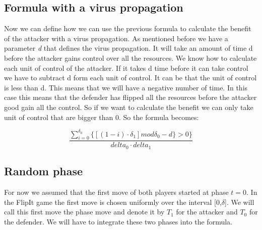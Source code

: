 \subsection{Formula with a virus propagation}
Now we can define how we can use the previous formula to calculate the benefit of the attacker with a virus propagation.
As mentioned before we have a parameter \textit{d} that defines the virus propagation. It will take an amount of time d before the attacker gains control over all the resources. We know how to calculate each unit of control of the attacker. If it takes d time before it can take control we have to subtract d form each unit of control. It can be that the unit of control is less than d. This means that we will have a negative number of time. In this case this means that the defender has flipped all the resources before the attacker good gain all the control. So if we want to calculate the benefit we can only take unit of control that are bigger than 0. So the formula becomes:

\begin{equation}\label{first}
\dfrac{\sum_{i=0}^{\delta_{0}} \lbrace [( 1 - i ) \cdot \delta_{1}] mod \delta_{0} - d \rbrace  > 0 \rbrace }{delta_{0} \cdot delta_{1}} 
\end{equation}

\subsection{Random phase}
For now we assumed that the first move of both players started at phase $t=0$. In the FlipIt game the first move is chosen uniformly over the interval [0,$\delta$]. We will call this first move the phase move and denote it by $T_{1}$ for the attacker and $T_{0}$ for the defender.
We will have to integrate these two phases into the formula.  
%
%





